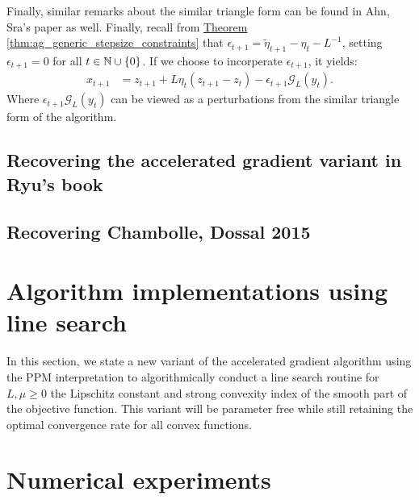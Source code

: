\documentclass[12pt]{article}
\begin{document}
\begin{remark}
            Finally, similar remarks about the similar triangle form can be found in Ahn, Sra's paper \cite{ahn_understanding_2022} as well. 
            Finally, recall from 
            \hyperref[thm:ag_generic_stepsize_constraints]
            {Theorem \ref*{thm:ag_generic_stepsize_constraints}}
            that $\epsilon_{t + 1} = \tilde \eta_{t + 1} - \eta_t - L^{-1}$, setting $\epsilon_{t + 1} =0$ for all $t \in \mathbb N \cup \{0\}$. 
            If we choose to incorperate $\epsilon_{t + 1}$, it yields: 
            \begin{align*}
                x_{t + 1} &= z_{t + 1} + L\eta_t(z_{t + 1} - z_t) - \epsilon_{t + 1}\mathcal G_L(y_t). 
            \end{align*}
            Where $\epsilon_{t + 1}\mathcal G_L(y_t)$ can be viewed as a perturbations from the similar triangle form of the algorithm. 
        \end{remark} 
        
    \subsection{Recovering the accelerated gradient variant in Ryu's book}
        
    \subsection{Recovering Chambolle, Dossal 2015}
        

\section{Algorithm implementations using line search}\label{sec:algorithm_improved}
    In this section, we state a new variant of the accelerated gradient algorithm using the PPM interpretation to algorithmically conduct a line search routine for $L, \mu \ge 0$ the Lipschitz constant and strong convexity index of the smooth part of the objective function. 
    This variant will be parameter free while still retaining the optimal convergence rate for all convex functions. 

\section{Numerical experiments}\label{sec:numerical_experiments}

\appendix

\begin{theorem}
    
\end{theorem}





\end{document}
